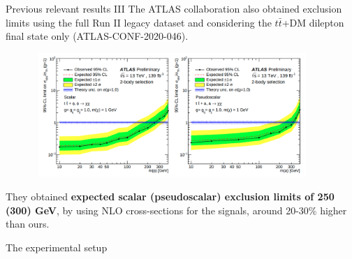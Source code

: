 \documentclass[8pt]{beamer}
\begin{document}
\begin{frame}{Previous relevant results III}
\justifying
The \alert{ATLAS collaboration also obtained exclusion limits} using the full Run II legacy dataset and considering the $t \bar t$+DM dilepton final state only (ATLAS-CONF-2020-046). \vfill

 \begin{figure}[htbp]
\centering
\includegraphics[width=10.5cm, height=4.7cm]{figs/ATLASICHEP.png}
\end{figure} \vfill

They obtained \textbf{expected scalar (pseudoscalar) exclusion limits of 250 (300) GeV}, by using NLO cross-sections for the signals, around 20-30\% higher than ours. \vfill
\end{frame}


















\begin{frame}[standout]
The experimental setup
\end{frame}
\end{document}
